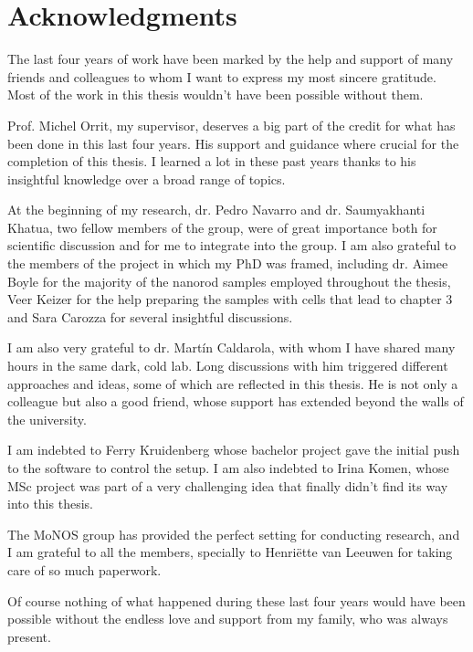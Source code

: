 \chapter*{Acknowledgments}


The last four years of work have been marked by the help and support of many
friends and colleagues to whom I want to express my most sincere gratitude.
Most of the work in this thesis wouldn't have been possible without them. 

Prof. Michel Orrit, my supervisor, deserves a big part of the credit for what
has been done in this last four years. His support and guidance where crucial
for the completion of this thesis. I learned a lot in these past years thanks to
his insightful knowledge over a broad range of topics. 

At the beginning of my research, dr. Pedro Navarro and dr. Saumyakhanti
Khatua, two fellow members of the group, were of great importance both for
scientific discussion and for me to integrate into the group. I am also
grateful to the members of the project in which my PhD was framed, including dr.
Aimee Boyle for the majority of the nanorod samples employed throughout the
thesis, Veer Keizer for the help preparing the samples with cells that lead
to chapter 3 and Sara Carozza for several insightful discussions. 

I am also very grateful to dr. Mart\'{i}n Caldarola, with whom I have shared
many hours in the same dark, cold lab. Long discussions with him triggered different
approaches and ideas, some of which are reflected in this thesis. He is not only
a colleague but also a good friend, whose support has extended beyond the walls
of the university.

I am indebted to Ferry Kruidenberg whose bachelor project gave the initial
push to the software to control the setup. I am also indebted to Irina Komen,
whose MSc project was part of a very challenging idea that finally didn't find
its way into this thesis. 

The MoNOS group has provided the perfect setting for conducting research, and I
am grateful to all the members, specially to Henri\"{e}tte van Leeuwen for
taking care of so much paperwork. 

Of course nothing of what happened during these last four years would have
been possible without the endless love and support from my family, who was
always present.
